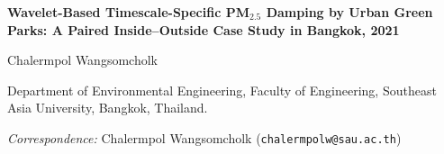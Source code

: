 \documentclass[12pt,a4paper]{article}
\begin{document}
\linenumbers

\begin{center}
    {\LARGE \bfseries Wavelet-Based Timescale-Specific PM$_{2.5}$ Damping by Urban Green Parks: A Paired Inside--Outside Case Study in Bangkok, 2021\par}
    \vspace{1em}
    {\large Chalermpol Wangsomcholk\par}
    \vspace{0.5em}
    {Department of Environmental Engineering, Faculty of Engineering, Southeast Asia University, Bangkok, Thailand.\par}
    \vspace{0.5em}
    {\textit{Correspondence:} Chalermpol Wangsomcholk (\texttt{chalermpolw@sau.ac.th})\par}
\end{center}

\vspace{1.5em}
\end{document}
